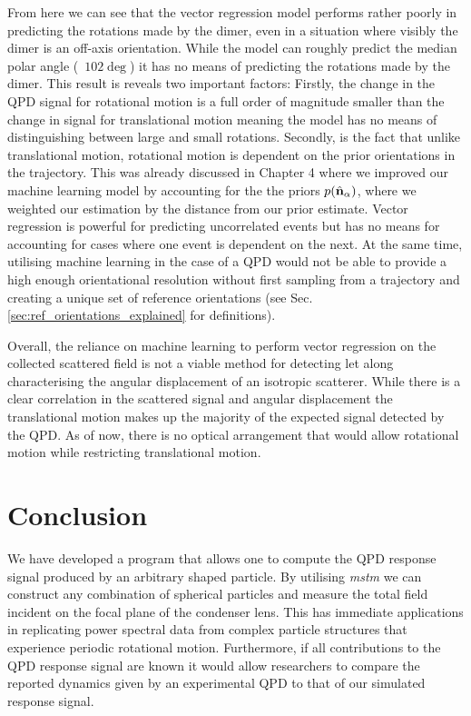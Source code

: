 From here we can see that the vector regression model performs rather
poorly in predicting the rotations made by the dimer, even in a situation
where visibly the dimer is an off-axis orientation. While the model can 
roughly predict the median polar angle (~$102\deg$) it has no means of
predicting the rotations made by the dimer. This result is reveals two important factors: Firstly, the change in the QPD signal for rotational
motion is a full order of magnitude smaller than the change in signal 
for translational motion meaning the model has no means of distinguishing
between large and small rotations. Secondly, is the fact that unlike 
translational motion, rotational motion is dependent on the prior 
orientations in the trajectory. This was already discussed in Chapter 4
where we improved our machine learning model by accounting for the 
the priors $p(\hat{\bf n}_\alpha)$, where we weighted our estimation 
by the distance from our prior estimate. Vector regression is powerful
for predicting uncorrelated events but has no means for accounting for
cases where one event is dependent on the next. At the same time, 
utilising machine learning in the case of a QPD would not be able to 
provide a high enough orientational resolution without first sampling 
from a trajectory and creating a unique set of reference orientations
(see Sec.~ \ref{sec:ref_orientations_explained} for definitions).

Overall, the reliance on machine learning to perform vector 
regression on the collected scattered field is not a viable 
method for detecting let along characterising the angular 
displacement of an isotropic scatterer. While there is a 
clear correlation in the scattered signal and angular 
displacement the translational motion makes up the majority 
of the expected signal detected by the QPD. As of now, there
is no optical arrangement that would allow rotational motion 
while restricting translational motion. 

\section{Conclusion}
We have developed a program that allows one to compute the QPD 
response signal produced by an arbitrary shaped particle. By 
utilising \textit{mstm} we can construct any combination of 
spherical particles and measure the total field incident on the
focal plane of the condenser lens. This has immediate applications 
in replicating power spectral data from complex particle structures 
that experience periodic rotational motion. Furthermore, if all 
contributions to the QPD response signal are known it would allow 
researchers to compare the reported dynamics given by an experimental
QPD to that of our simulated response signal. 

